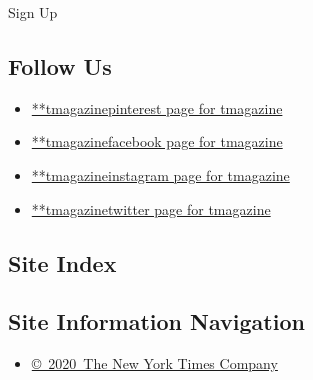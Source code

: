 Sign Up

\hypertarget{follow-us}{%
\subsection{Follow Us}\label{follow-us}}

\begin{itemize}
\tightlist
\item
  \href{https://pinterest.com/tmagazine}{**tmagazinepinterest page for
  tmagazine}
\item
  \href{https://www.facebookcorewwwi.onion/tmagazine}{**tmagazinefacebook
  page for tmagazine}
\item
  \href{https://instagram.com/tmagazine}{**tmagazineinstagram page for
  tmagazine}
\item
  \href{https://twitter.com/tmagazine}{**tmagazinetwitter page for
  tmagazine}
\end{itemize}

\hypertarget{site-index}{%
\subsection{Site Index}\label{site-index}}

\hypertarget{site-information-navigation}{%
\subsection{Site Information
Navigation}\label{site-information-navigation}}

\begin{itemize}
\tightlist
\item
  \href{https://help.nytimes3xbfgragh.onion/hc/en-us/articles/115014792127-Copyright-notice}{©~2020~The
  New York Times Company}
\end{itemize}

